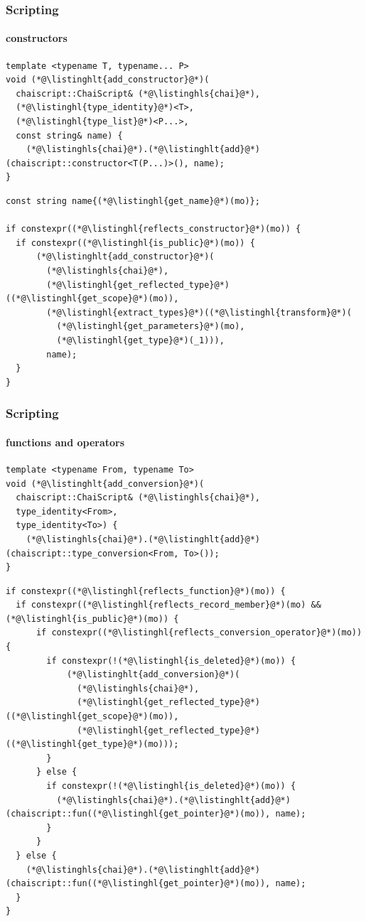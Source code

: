 \documentclass[aspectratio=169,compress,table,xcolor=table]{beamer}
\begin{document}
\begin{frame}[fragile]
  \frametitle{Scripting}
  \framesubtitle{constructors}
  \begin{lstlisting}[language=c++2x,basicstyle=\scriptsize\ttfamily]
template <typename T, typename... P>
void (*@\listinghlt{add_constructor}@*)(
  chaiscript::ChaiScript& (*@\listinghls{chai}@*),
  (*@\listinghl{type_identity}@*)<T>,
  (*@\listinghl{type_list}@*)<P...>,
  const string& name) {
    (*@\listinghls{chai}@*).(*@\listinghlt{add}@*)(chaiscript::constructor<T(P...)>(), name);
}
  \end{lstlisting}
  \begin{lstlisting}[language=c++2x,basicstyle=\scriptsize\ttfamily]
const string name{(*@\listinghl{get_name}@*)(mo)};

if constexpr((*@\listinghl{reflects_constructor}@*)(mo)) {
  if constexpr((*@\listinghl{is_public}@*)(mo)) {
      (*@\listinghlt{add_constructor}@*)(
        (*@\listinghls{chai}@*),
        (*@\listinghl{get_reflected_type}@*)((*@\listinghl{get_scope}@*)(mo)),
        (*@\listinghl{extract_types}@*)((*@\listinghl{transform}@*)(
          (*@\listinghl{get_parameters}@*)(mo),
          (*@\listinghl{get_type}@*)(_1))),
        name);
  }
}
  \end{lstlisting}
\end{frame}
\begin{frame}[fragile]
  \frametitle{Scripting}
  \framesubtitle{functions and operators}
  \begin{lstlisting}[language=c++2x,basicstyle=\scriptsize\ttfamily]
template <typename From, typename To>
void (*@\listinghlt{add_conversion}@*)(
  chaiscript::ChaiScript& (*@\listinghls{chai}@*),
  type_identity<From>,
  type_identity<To>) {
    (*@\listinghls{chai}@*).(*@\listinghlt{add}@*)(chaiscript::type_conversion<From, To>());
}
  \end{lstlisting}
  \begin{lstlisting}[language=c++2x,basicstyle=\tiny\ttfamily]
if constexpr((*@\listinghl{reflects_function}@*)(mo)) {
  if constexpr((*@\listinghl{reflects_record_member}@*)(mo) && (*@\listinghl{is_public}@*)(mo)) {
      if constexpr((*@\listinghl{reflects_conversion_operator}@*)(mo)) {
        if constexpr(!(*@\listinghl{is_deleted}@*)(mo)) {
            (*@\listinghlt{add_conversion}@*)(
              (*@\listinghls{chai}@*),
              (*@\listinghl{get_reflected_type}@*)((*@\listinghl{get_scope}@*)(mo)),
              (*@\listinghl{get_reflected_type}@*)((*@\listinghl{get_type}@*)(mo)));
        }
      } else {
        if constexpr(!(*@\listinghl{is_deleted}@*)(mo)) {
          (*@\listinghls{chai}@*).(*@\listinghlt{add}@*)(chaiscript::fun((*@\listinghl{get_pointer}@*)(mo)), name);
        }
      }
  } else {
    (*@\listinghls{chai}@*).(*@\listinghlt{add}@*)(chaiscript::fun((*@\listinghl{get_pointer}@*)(mo)), name);
  }
}
  \end{lstlisting}
\end{frame}
\end{document}
